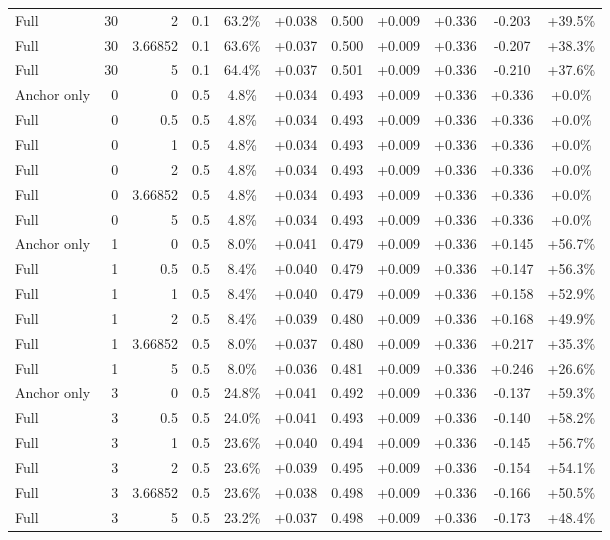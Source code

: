 \begin{table}[htbp]
\begin{tabular}{lrrrccccccc}
Full & 30 & 2 & 0.1 & 63.2\% & +0.038 & 0.500 & +0.009 & +0.336 & -0.203 & +39.5\% \\
Full & 30 & 3.66852 & 0.1 & 63.6\% & +0.037 & 0.500 & +0.009 & +0.336 & -0.207 & +38.3\% \\
Full & 30 & 5 & 0.1 & 64.4\% & +0.037 & 0.501 & +0.009 & +0.336 & -0.210 & +37.6\% \\
Anchor only & 0 & 0 & 0.5 & 4.8\% & +0.034 & 0.493 & +0.009 & +0.336 & +0.336 & +0.0\% \\
Full & 0 & 0.5 & 0.5 & 4.8\% & +0.034 & 0.493 & +0.009 & +0.336 & +0.336 & +0.0\% \\
Full & 0 & 1 & 0.5 & 4.8\% & +0.034 & 0.493 & +0.009 & +0.336 & +0.336 & +0.0\% \\
Full & 0 & 2 & 0.5 & 4.8\% & +0.034 & 0.493 & +0.009 & +0.336 & +0.336 & +0.0\% \\
Full & 0 & 3.66852 & 0.5 & 4.8\% & +0.034 & 0.493 & +0.009 & +0.336 & +0.336 & +0.0\% \\
Full & 0 & 5 & 0.5 & 4.8\% & +0.034 & 0.493 & +0.009 & +0.336 & +0.336 & +0.0\% \\
Anchor only & 1 & 0 & 0.5 & 8.0\% & +0.041 & 0.479 & +0.009 & +0.336 & +0.145 & +56.7\% \\
Full & 1 & 0.5 & 0.5 & 8.4\% & +0.040 & 0.479 & +0.009 & +0.336 & +0.147 & +56.3\% \\
Full & 1 & 1 & 0.5 & 8.4\% & +0.040 & 0.479 & +0.009 & +0.336 & +0.158 & +52.9\% \\
Full & 1 & 2 & 0.5 & 8.4\% & +0.039 & 0.480 & +0.009 & +0.336 & +0.168 & +49.9\% \\
Full & 1 & 3.66852 & 0.5 & 8.0\% & +0.037 & 0.480 & +0.009 & +0.336 & +0.217 & +35.3\% \\
Full & 1 & 5 & 0.5 & 8.0\% & +0.036 & 0.481 & +0.009 & +0.336 & +0.246 & +26.6\% \\
Anchor only & 3 & 0 & 0.5 & 24.8\% & +0.041 & 0.492 & +0.009 & +0.336 & -0.137 & +59.3\% \\
Full & 3 & 0.5 & 0.5 & 24.0\% & +0.041 & 0.493 & +0.009 & +0.336 & -0.140 & +58.2\% \\
Full & 3 & 1 & 0.5 & 23.6\% & +0.040 & 0.494 & +0.009 & +0.336 & -0.145 & +56.7\% \\
Full & 3 & 2 & 0.5 & 23.6\% & +0.039 & 0.495 & +0.009 & +0.336 & -0.154 & +54.1\% \\
Full & 3 & 3.66852 & 0.5 & 23.6\% & +0.038 & 0.498 & +0.009 & +0.336 & -0.166 & +50.5\% \\
Full & 3 & 5 & 0.5 & 23.2\% & +0.037 & 0.498 & +0.009 & +0.336 & -0.173 & +48.4\% \\

\end{tabular}
\end{table}
